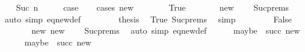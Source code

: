 \begin{isabellebody}
\isanewline
\ \ \isamarkupfalse%
\ {\isacharparenleft}{\kern0pt}Suc\ n{\isacharparenright}{\kern0pt}\isanewline
\ \ \isamarkupfalse%
\ \isamarkupfalse%
\ {\isacharquery}{\kern0pt}case\isanewline
\ \ \isamarkupfalse%
\ {\isacharparenleft}{\kern0pt}cases\ {\isachardoublequoteopen}new\ {\isacharequal}{\kern0pt}\ {\isacharbrackleft}{\kern0pt}{\isacharbrackright}{\kern0pt}{\isachardoublequoteclose}{\isacharparenright}{\kern0pt}\isanewline
\ \ \ \ \isamarkupfalse%
\ True\isanewline
\ \ \ \ \isamarkupfalse%
\ \isamarkupfalse%
\ {\isachardoublequoteopen}new{\isacharprime}{\kern0pt}\ {\isacharequal}{\kern0pt}\ {\isacharbrackleft}{\kern0pt}{\isacharbrackright}{\kern0pt}{\isachardoublequoteclose}\ \isamarkupfalse%
\ Suc{\isachardot}{\kern0pt}prems{\isacharparenleft}{\kern0pt}{}{\isacharparenright}{\kern0pt}\ \isamarkupfalse%
\ {\isacharparenleft}{\kern0pt}auto\ simp{\isacharcolon}{\kern0pt}\ eq{\isacharunderscore}{\kern0pt}new{\isacharunderscore}{\kern0pt}def{\isacharparenright}{\kern0pt}\ \isanewline
\ \ \ \ \isamarkupfalse%
\ \isamarkupfalse%
\ {\isacharquery}{\kern0pt}thesis\ \isamarkupfalse%
\ True\ Suc{\isachardot}{\kern0pt}prems{\isacharparenleft}{\kern0pt}{}{\isacharparenright}{\kern0pt}\ \isamarkupfalse%
\ simp\isanewline
\ \ \isamarkupfalse%
\isanewline
\ \ \ \ \isamarkupfalse%
\ False\isanewline
\ \ \ \ \isamarkupfalse%
\ \isamarkupfalse%
\ new{\isacharprime}{\kern0pt}{\isacharcolon}{\kern0pt}\ {\isachardoublequoteopen}new{\isacharprime}{\kern0pt}\ {\isasymnoteq}\ {\isacharbrackleft}{\kern0pt}{\isacharbrackright}{\kern0pt}{\isachardoublequoteclose}\ \isamarkupfalse%
\ Suc{\isachardot}{\kern0pt}prems{\isacharparenleft}{\kern0pt}{}{\isacharparenright}{\kern0pt}\ \isamarkupfalse%
\ {\isacharparenleft}{\kern0pt}auto\ simp{\isacharcolon}{\kern0pt}\ eq{\isacharunderscore}{\kern0pt}new{\isacharunderscore}{\kern0pt}def{\isacharparenright}{\kern0pt}\isanewline
\ \ \ \ \isamarkupfalse%
\ {\isacharquery}{\kern0pt}maybe{}\ {\isacharequal}{\kern0pt}\ {\isachardoublequoteopen}succ\ new{\isachardoublequoteclose}\isanewline
\ \ \ \ \isamarkupfalse%
\ {\isacharquery}{\kern0pt}maybe{}\ {\isacharequal}{\kern0pt}\ {\isachardoublequoteopen}succ{\isacharprime}{\kern0pt}\ new{\isacharprime}{\kern0pt}{\isachardoublequoteclose}\isanewline

\end{isabellebody}
